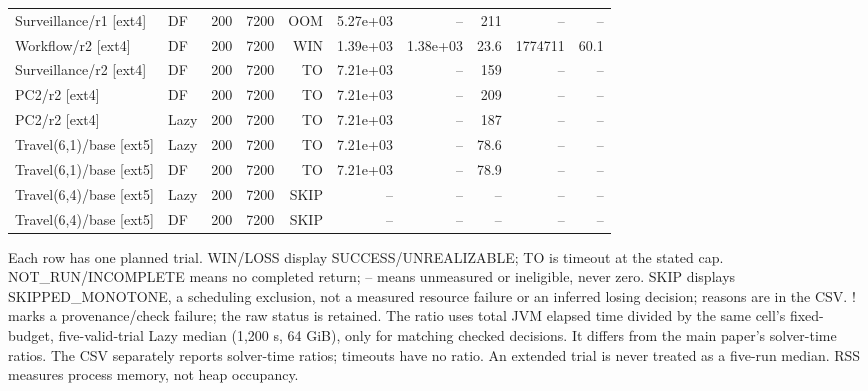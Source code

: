 \begin{longtable}{@{}llrrrrrrrr@{}}
Surveillance/r1 [ext4] & DF & 200 & 7200 & OOM & 5.27e+03 & -- & 211 & -- & --\\
Workflow/r2 [ext4] & DF & 200 & 7200 & WIN & 1.39e+03 & 1.38e+03 & 23.6 & 1774711 & 60.1\\
Surveillance/r2 [ext4] & DF & 200 & 7200 & TO & 7.21e+03 & -- & 159 & -- & --\\
PC2/r2 [ext4] & DF & 200 & 7200 & TO & 7.21e+03 & -- & 209 & -- & --\\
PC2/r2 [ext4] & Lazy & 200 & 7200 & TO & 7.21e+03 & -- & 187 & -- & --\\
Travel(6,1)/base [ext5] & Lazy & 200 & 7200 & TO & 7.21e+03 & -- & 78.6 & -- & --\\
Travel(6,1)/base [ext5] & DF & 200 & 7200 & TO & 7.21e+03 & -- & 78.9 & -- & --\\
Travel(6,4)/base [ext5] & Lazy & 200 & 7200 & SKIP & -- & -- & -- & -- & --\\
Travel(6,4)/base [ext5] & DF & 200 & 7200 & SKIP & -- & -- & -- & -- & --\\
\bottomrule\end{longtable}\endgroup
Each row has one planned trial. WIN/LOSS display SUCCESS/UNREALIZABLE; TO is timeout at the stated cap. NOT\_RUN/INCOMPLETE means no completed return; -- means unmeasured or ineligible, never zero. SKIP displays SKIPPED\_MONOTONE, a scheduling exclusion, not a measured resource failure or an inferred losing decision; reasons are in the CSV. ! marks a provenance/check failure; the raw status is retained. The ratio uses total JVM elapsed time divided by the same cell's fixed-budget, five-valid-trial Lazy median (1,200 s, 64 GiB), only for matching checked decisions. It differs from the main paper's solver-time ratios. The CSV separately reports solver-time ratios; timeouts have no ratio. An extended trial is never treated as a five-run median. RSS measures process memory, not heap occupancy.
